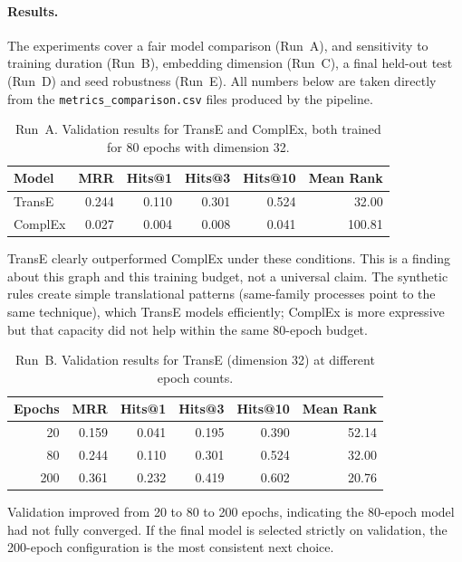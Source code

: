 \documentclass{article}
\begin{document}
\paragraph{Results.} The experiments cover a fair model comparison (Run~A),
and sensitivity to training duration (Run~B), embedding dimension (Run~C), a
final held-out test (Run~D) and seed robustness (Run~E). All numbers below are
taken directly from the \texttt{metrics\_comparison.csv} files produced by the
pipeline.

\begin{table}[h]
\centering
\begin{tabular}{lrrrrr}
\toprule
\textbf{Model} & \textbf{MRR} & \textbf{Hits@1} & \textbf{Hits@3} & \textbf{Hits@10} & \textbf{Mean Rank} \\
\midrule
TransE & 0.244 & 0.110 & 0.301 & 0.524 & 32.00 \\
ComplEx & 0.027 & 0.004 & 0.008 & 0.041 & 100.81 \\
\bottomrule
\end{tabular}
\caption{Run~A. Validation results for TransE and ComplEx, both trained for 80 epochs with dimension 32.}
\end{table}

TransE clearly outperformed ComplEx under these conditions. This is a finding
about this graph and this training budget, not a universal claim. The
synthetic rules create simple translational patterns (same-family processes
point to the same technique), which TransE models efficiently; ComplEx is more
expressive but that capacity did not help within the same 80-epoch budget.

\begin{table}[h]
\centering
\begin{tabular}{rrrrrr}
\toprule
\textbf{Epochs} & \textbf{MRR} & \textbf{Hits@1} & \textbf{Hits@3} & \textbf{Hits@10} & \textbf{Mean Rank} \\
\midrule
20 & 0.159 & 0.041 & 0.195 & 0.390 & 52.14 \\
80 & 0.244 & 0.110 & 0.301 & 0.524 & 32.00 \\
200 & 0.361 & 0.232 & 0.419 & 0.602 & 20.76 \\
\bottomrule
\end{tabular}
\caption{Run~B. Validation results for TransE (dimension 32) at different epoch counts.}
\end{table}

Validation improved from 20 to 80 to 200 epochs, indicating the 80-epoch model
had not fully converged. If the final model is selected strictly on
validation, the 200-epoch configuration is the most consistent next choice.
\end{document}
